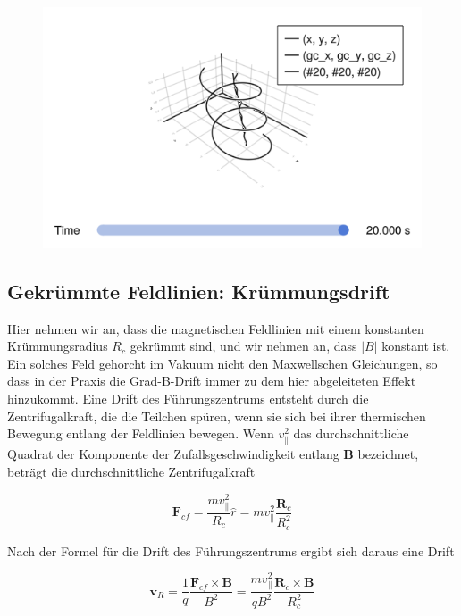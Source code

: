 \documentclass[
  a4paper,
  DIV=11]{scrreprt}
\begin{document}
\begin{figure}[H]

{\centering \includegraphics{./Tutorial_files/figure-pdf/cell-7-output-1.png}

}

\end{figure}

\hypertarget{gekruxfcmmte-feldlinien-kruxfcmmungsdrift}{%
\subsection{Gekrümmte Feldlinien:
Krümmungsdrift}\label{gekruxfcmmte-feldlinien-kruxfcmmungsdrift}}

Hier nehmen wir an, dass die magnetischen Feldlinien mit einem
konstanten Krümmungsradius \(R_c\) gekrümmt sind, und wir nehmen an,
dass \(|B|\) konstant ist. Ein solches Feld gehorcht im Vakuum nicht den
Maxwellschen Gleichungen, so dass in der Praxis die Grad-B-Drift immer
zu dem hier abgeleiteten Effekt hinzukommt. Eine Drift des
Führungszentrums entsteht durch die Zentrifugalkraft, die die Teilchen
spüren, wenn sie sich bei ihrer thermischen Bewegung entlang der
Feldlinien bewegen. Wenn \(v_\parallel^2\) das durchschnittliche Quadrat
der Komponente der Zufallsgeschwindigkeit entlang \(\mathbf{B}\)
bezeichnet, beträgt die durchschnittliche Zentrifugalkraft

\[
\mathbf{F}_{cf} = \frac{mv_\parallel^2}{R_c}\widehat{r} = mv_\parallel^2\frac{\mathbf{R}_c}{R_c^2}
\]

Nach der Formel für die Drift des Führungszentrums ergibt sich daraus
eine Drift

\[
\mathbf{v}_{R} = \frac{1}{q}\frac{\mathbf{F}_{cf}\times\mathbf{B}}{B^2} = \frac{mv_\parallel^2}{qB^2}\frac{\mathbf{R}_c \times\mathbf{B}}{R_c^2}
\]
\end{document}

